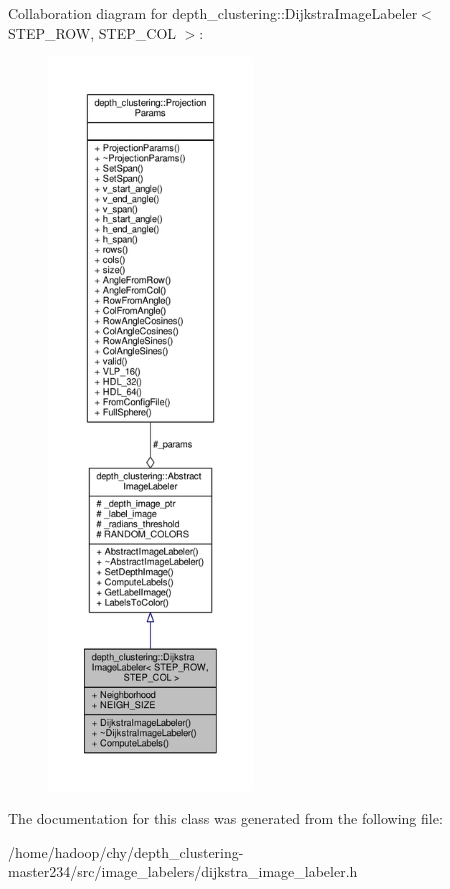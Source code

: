 Collaboration diagram for depth\-\_\-clustering\-:\-:Dijkstra\-Image\-Labeler$<$ S\-T\-E\-P\-\_\-\-R\-O\-W, S\-T\-E\-P\-\_\-\-C\-O\-L $>$\-:
\nopagebreak
\begin{figure}[H]
\begin{center}
\leavevmode
\includegraphics[height=550pt]{classdepth__clustering_1_1DijkstraImageLabeler__coll__graph}
\end{center}
\end{figure}


The documentation for this class was generated from the following file\-:\begin{DoxyCompactItemize}
\item 
/home/hadoop/chy/depth\-\_\-clustering-\/master234/src/image\-\_\-labelers/dijkstra\-\_\-image\-\_\-labeler.\-h\end{DoxyCompactItemize}
